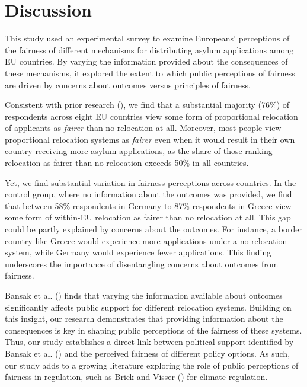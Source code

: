 \documentclass[
  12pt,
  a4paper,
]{article}
\begin{document}
\section{Discussion}\label{discussion}

This study used an experimental survey to examine Europeans' perceptions of the fairness of different mechanisms for distributing asylum applications among EU countries. By varying the information provided about the consequences of these mechanisms, it explored the extent to which public perceptions of fairness are driven by concerns about outcomes versus principles of fairness.

Consistent with prior research (), we find that a substantial majority (76\%) of respondents across eight EU countries view some form of proportional relocation of applicants as \emph{fairer} than no relocation at all. Moreover, most people view proportional relocation systems as \emph{fairer} even when it would result in their own country receiving more asylum applications, as the share of those ranking relocation as fairer than no relocation exceeds 50\% in all countries.

Yet, we find substantial variation in fairness perceptions across countries. In the control group, where no information about the outcomes was provided, we find that between 58\% respondents in Germany to 87\% respondents in Greece view some form of within-EU relocation as fairer than no relocation at all. This gap could be partly explained by concerns about the outcomes. For instance, a border country like Greece would experience more applications under a no relocation system, while Germany would experience fewer applications. This finding underscores the importance of disentangling concerns about outcomes from fairness.

Bansak et al. () finds that varying the information available about outcomes significantly affects public support for different relocation systems. Building on this insight, our research demonstrates that providing information about the consequences is key in shaping public perceptions of the fairness of these systems. Thus, our study establishes a direct link between political support identified by Bansak et al. () and the perceived fairness of different policy options. As such, our study adds to a growing literature exploring the role of public perceptions of fairness in regulation, such as Brick and Visser () for climate regulation.
\end{document}
